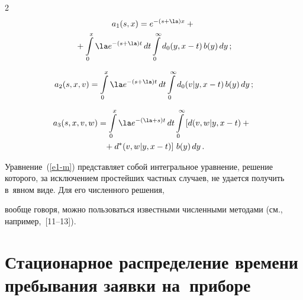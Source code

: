 \begin{multicols}{2}
\begin{multline*}
a_1(s,x) = e^{-(s+\la)x}+ {}\\


{}+\int\limits_0^x \la e^{-(s+\la) t}\, dt


\int\limits_0^\infty d_0(y,x-t)\,b(y)\, dy\,;


\end{multline*}





\vspace*{-9pt}





\noindent


\begin{equation*}


a_2(s,x,v) = \int\limits_0^x \la e^{-(s+\la) t} \,dt


\int\limits_0^\infty d_0(v|y,x-t)\, b(y)\, dy\,;


\end{equation*}





\vspace*{-12pt}





\noindent


\begin{multline*}


\hspace*{-3.0176pt}a_3(s,x,v,w) = \int\limits_0^x \la e^{-(\la+s) t}\, dt


\int\limits_0^\infty \left[\vphantom{d^*}


d(v,w|y,x-t)+{}\right.\\


\left.{}+d^*(v,w|y,x-t)\right]\, b(y)\, dy\,.


\end{multline*}





Уравнение~(\ref{e1-m}) представляет собой интегральное уравнение, решение которого, за исключением простейших частных случаев, не удается получить в~явном виде. Для его численного решения,


вообще говоря, можно пользоваться известными численными методами (см., например,~[11--13]).





\section{Стационарное распределение времени пребывания заявки на~приборе}






\end{multicols}
